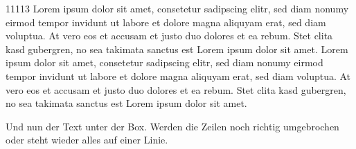 \begin{info}{11113}
	Lorem ipsum dolor sit amet, consetetur sadipscing elitr, sed diam nonumy eirmod tempor invidunt ut labore et dolore magna aliquyam erat, sed diam voluptua. At vero eos et accusam et justo duo dolores et ea rebum. Stet clita kasd gubergren, no sea takimata sanctus est Lorem ipsum dolor sit amet. Lorem ipsum dolor sit amet, consetetur sadipscing elitr, sed diam nonumy eirmod tempor invidunt ut labore et dolore magna aliquyam erat, sed diam voluptua. At vero eos et accusam et justo duo dolores et ea rebum. Stet clita kasd gubergren, no sea takimata sanctus est Lorem ipsum dolor sit amet.
\end{info}

Und nun der Text unter der Box. Werden die Zeilen noch richtig umgebrochen oder steht wieder alles auf einer Linie.

